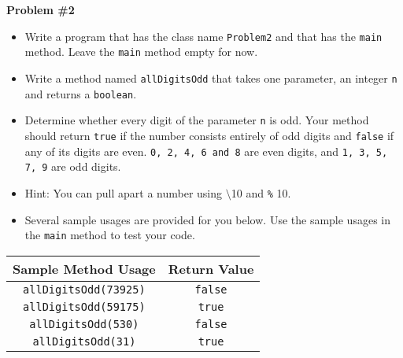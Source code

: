 \documentclass[12pt]{article}
\begin{document}
\vspace*{0.5cm}
\noindent\textbf{Problem \#2}
\begin{itemize}
	\item Write a program that has the class name \texttt{Problem2} and that has the \texttt{main} method. Leave the \texttt{main} method empty for now.
	\item Write a method named \texttt{allDigitsOdd} that takes one parameter, an integer \texttt{n} and returns a \texttt{boolean}.
	\item Determine whether every digit of the parameter \texttt{n} is odd. Your method should return \texttt{true} if the number consists entirely of odd digits and \texttt{false} if any of its digits are even. \texttt{0, 2, 4, 6 and 8} are even digits, and \texttt{1, 3, 5, 7, 9} are odd digits. 
	\item Hint: You can pull apart a number using \texttt{$\setminus$}10 and \texttt{\%} 10.
	\item Several sample usages are provided for you below. Use the sample usages in the \texttt{main} method to test your code.
\end{itemize}
\begin{center}
\begin{tabular}{| c | c |}
\hline\rule{0pt}{4ex}
Sample Method Usage & Return Value \\
\hline\rule{0pt}{4ex}
\texttt{allDigitsOdd(73925)} & \texttt{false}\\
\hline\rule{0pt}{4ex}
\texttt{allDigitsOdd(59175)} & \texttt{true}\\
\hline\rule{0pt}{4ex}
\texttt{allDigitsOdd(530)} & \texttt{false}\\
\hline\rule{0pt}{4ex}
\texttt{allDigitsOdd(31)} & \texttt{true}\\
\hline
\end{tabular}
\end{center}
\end{document}
